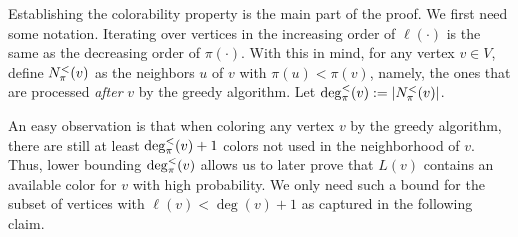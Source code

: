 	Establishing the colorability property is the main part of the proof. We first need some notation. 
	Iterating over vertices in the increasing order of $\ell(\cdot)$ is the same as the decreasing order of $\pi(\cdot)$. 
	With this in mind, for any vertex $v \in V$, define $N^{<}_{\pi}(v)$ as the neighbors $u$ of $v$ with $\pi(u) < \pi(v)$, namely, the ones that are processed 
	\emph{after} $v$ by the greedy algorithm. Let  $\deg^{<}_{\pi}(v):= \left\vert{\ensuremath{N^{<}_{\pi}(v)}}\right\vert$. 
	
	An easy observation is that when coloring any vertex $v$ by the greedy algorithm, there are still at least $\deg^{<}_{\pi}(v)+1$ colors not used in the neighborhood of $v$. 
	Thus, lower bounding $\deg^{<}_{\pi}(v)$ allows us to later prove that $L(v)$ contains an available color for $v$ with high probability.  
	We only need such a bound for the subset of vertices with $\ell(v) < \deg(v)+1$ as captured in the following claim. 
	
